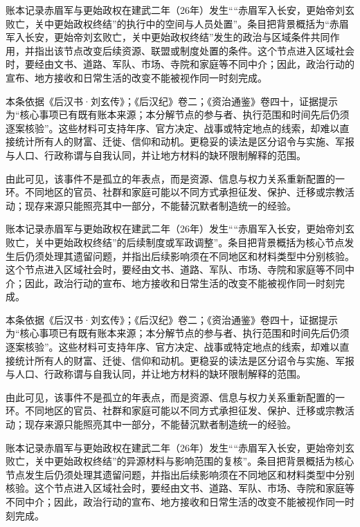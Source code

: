 账本记录赤眉军与更始政权在建武二年（26年）发生““赤眉军入长安，更始帝刘玄败亡，关中更始政权终结”的执行中的空间与人员处置”。条目把背景概括为“赤眉军入长安，更始帝刘玄败亡，关中更始政权终结”发生的政治与区域条件共同作用，并指出该节点改变后续资源、联盟或制度处置的条件。这个节点进入区域社会时，要经由文书、道路、军队、市场、寺院和家庭等不同中介；因此，政治行动的宣布、地方接收和日常生活的改变不能被视作同一时刻完成。

本条依据《后汉书·刘玄传》；《后汉纪》卷二；《资治通鉴》卷四十，证据提示为“核心事项已有既有账本来源；本分解节点的参与者、执行范围和时间先后仍须逐案核验”。这些材料可支持年序、官方决定、战事或特定地点的线索，却难以直接统计所有人的财富、迁徙、信仰和动机。更稳妥的读法是区分诏令与实施、军报与人口、行政称谓与自我认同，并让地方材料的缺环限制解释的范围。

由此可见，该事件不是孤立的年表点，而是资源、信息与权力关系重新配置的一环。不同地区的官员、社群和家庭可能以不同方式承担征发、保护、迁移或宗教活动；现存来源只能照亮其中一部分，不能替沉默者制造统一的经验。

账本记录赤眉军与更始政权在建武二年（26年）发生““赤眉军入长安，更始帝刘玄败亡，关中更始政权终结”的后续制度或军政调整”。条目把背景概括为核心节点发生后仍须处理其遗留问题，并指出后续影响须在不同地区和材料类型中分别核验。这个节点进入区域社会时，要经由文书、道路、军队、市场、寺院和家庭等不同中介；因此，政治行动的宣布、地方接收和日常生活的改变不能被视作同一时刻完成。

本条依据《后汉书·刘玄传》；《后汉纪》卷二；《资治通鉴》卷四十，证据提示为“核心事项已有既有账本来源；本分解节点的参与者、执行范围和时间先后仍须逐案核验”。这些材料可支持年序、官方决定、战事或特定地点的线索，却难以直接统计所有人的财富、迁徙、信仰和动机。更稳妥的读法是区分诏令与实施、军报与人口、行政称谓与自我认同，并让地方材料的缺环限制解释的范围。

由此可见，该事件不是孤立的年表点，而是资源、信息与权力关系重新配置的一环。不同地区的官员、社群和家庭可能以不同方式承担征发、保护、迁移或宗教活动；现存来源只能照亮其中一部分，不能替沉默者制造统一的经验。

账本记录赤眉军与更始政权在建武二年（26年）发生““赤眉军入长安，更始帝刘玄败亡，关中更始政权终结”的异源材料与影响范围的复核”。条目把背景概括为核心节点发生后仍须处理其遗留问题，并指出后续影响须在不同地区和材料类型中分别核验。这个节点进入区域社会时，要经由文书、道路、军队、市场、寺院和家庭等不同中介；因此，政治行动的宣布、地方接收和日常生活的改变不能被视作同一时刻完成。

